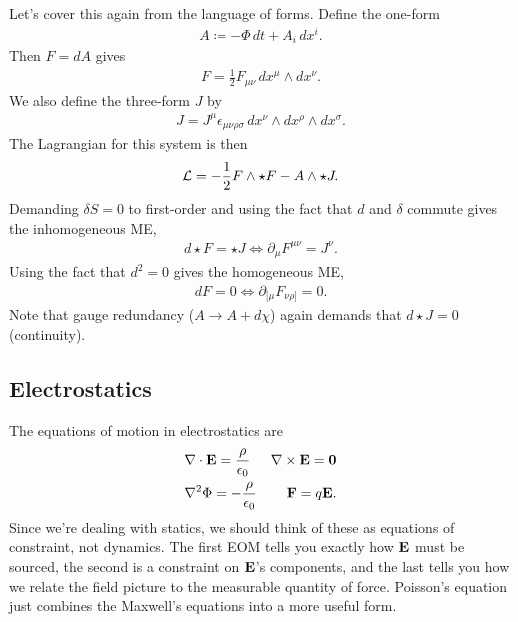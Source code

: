 \documentclass[11pt]{article}
\begin{document}
\begin{dderivation}
    \noin
    Let's cover this again from the language of forms.
    Define the one-form
    \begin{align*}
        A \coloneqq - \Phi \, dt + A_i \, dx^i.
    \end{align*}
    Then $F = dA$ gives
    \begin{align*}
        F = \frac{1}{2} F_{\mu \nu} \, dx^\mu \wedge dx^\nu.
    \end{align*} 
    We also define the three-form $J$ by
    \begin{align*}
        J = J^\mu \epsilon_{\mu \nu \rho \sigma} \, dx^\nu \wedge dx^\rho \wedge dx^\sigma.
    \end{align*}
    The Lagrangian for this system is then
    \begin{align*}
        \mathcal{L} = - \frac{1}{2} F \wedge \star F - A \wedge \star J.
    \end{align*}
    Demanding $\delta S = 0$ to first-order and using the fact that
    $d$ and $\delta$ commute gives the inhomogeneous ME,
    \begin{align*}
        \boxed{d \star F = \star J} \iff \partial_\mu F^{\mu \nu} = J^\nu.
    \end{align*}
    Using the fact that $d^2 = 0$ gives the homogeneous ME,
    \begin{align*}
       \boxed{dF = 0} \iff \partial_{[\mu} F_{\nu \rho]} = 0.
    \end{align*}
    Note that gauge redundancy ($A \to A + d\chi$) again demands
    that $d \star J = 0$ (continuity).
\end{dderivation}


\subsection{Electrostatics}

The equations of motion in electrostatics are
\begin{align*}
    & \nabla \cdot \mathbf{E} = \frac{\rho}{\epsilon_0}
    & \nabla \times \mathbf{E} = \mathbf{0}\\
    & \nabla^2 \Phi = - \frac{\rho}{\epsilon_0}
    & \mathbf{F} = q \mathbf{E}.
\end{align*}
Since we're dealing with statics, we should think of these as equations of constraint,
not dynamics. The first EOM tells you exactly how $\mathbf{E}$ must be sourced,
the second is a constraint on $\mathbf{E}$'s components,
and the last tells you how we relate the field picture
to the measurable quantity of force. Poisson's equation 
just combines the Maxwell's equations into a more useful 
form.
\end{document}
